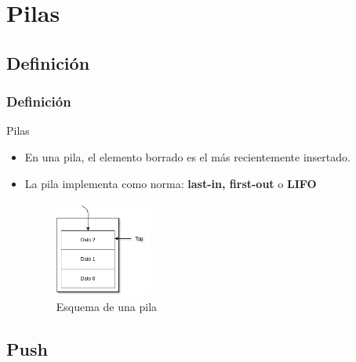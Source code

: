 \documentclass{beamer}
\begin{document}
\section{Pilas}

\subsection{Definición}

\begin{frame}
    \frametitle{Definición}
    Pilas \\
    \begin{itemize}
      \item En una pila, el elemento borrado es el más recientemente insertado.
      \item La pila implementa como norma: \textbf{last-in, first-out} o  \textbf{LIFO}

      \begin{figure}
      \caption{Esquema de una pila}
      \includegraphics[width=0.3\textwidth]{images/pila}
      
      \end{figure}
    \end{itemize}
        
    
\end{frame}



\subsection{Push}
\end{document}
